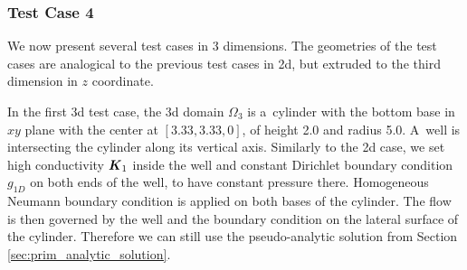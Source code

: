 %
%

\subsubsection{Test Case 4}
We now present several test cases in 3 dimensions. The geometries of the test cases
are analogical to the previous test cases in 2d, but extruded to the third dimension in $z$ coordinate.

In the first 3d test case, the 3d domain $\Omega_3$ is a~cylinder with the bottom base in $xy$ plane
with the center at $[3.33,3.33,0]$, of height 2.0 and radius 5.0.
A~well is intersecting the cylinder along its vertical axis.
Similarly to the 2d case, we set high conductivity $\mathbf{\boldsymbol{K}}_1$ inside the well and constant Dirichlet boundary condition $g_{1D}$ on both ends of the well,
to have constant pressure there.
Homogeneous Neumann boundary condition is applied on both bases of the cylinder. The flow is then governed 
by the well and the boundary condition on the lateral surface of the cylinder.
Therefore we can still use the pseudo-analytic solution from Section \ref{sec:prim_analytic_solution}.

